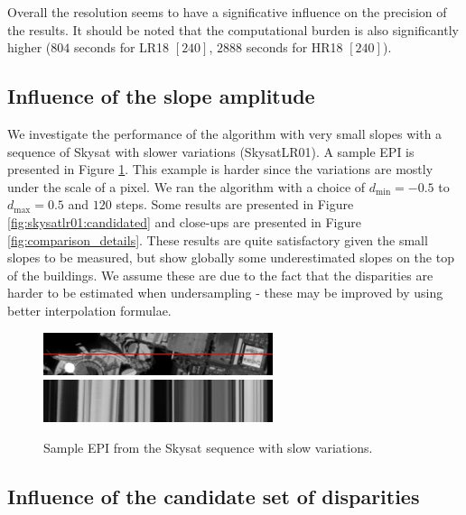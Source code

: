 \documentclass{article}
\def\epiWidth{0.6}
\theoremstyle{definition}
\begin{document}
Overall the resolution seems to have a significative influence on the precision of the results. It should be noted that the computational burden is also significantly higher ($804$ seconds for LR18 $[240]$, $2888$ seconds for HR18 $[240]$).


\subsection{Influence of the slope amplitude} 


We investigate the performance of the algorithm with very small slopes with a sequence of Skysat with slower variations (SkysatLR01). A sample EPI is presented in Figure \ref{fig:epi:skysat1}. This example is harder since the variations are mostly under the scale of a pixel. We ran the algorithm with a choice of $d_{\min} = -0.5$ to $d_{\max} = 0.5$ and $120$ steps. Some results are presented in Figure \ref{fig:skysatlr01:candidated} and close-ups are presented in Figure \ref{fig:comparison_details}. These results are quite satisfactory given the small slopes to be measured, but show globally some underestimated slopes on the top of the buildings. We assume these are due to the fact that the disparities are harder to be estimated when undersampling - these may be improved by using better interpolation formulae.


\begin{figure}[ht]
  \centering
  \includegraphics[width=\epiWidth\textwidth]{images/1521592293547_1st.png}\\
  \includegraphics[width=\epiWidth\textwidth]{images/1521592293547_epi.png}
  \caption{Sample EPI from the Skysat sequence with slow variations.}
  \label{fig:epi:skysat1}
\end{figure}



\subsection{Influence of the candidate set of disparities}
\end{document}
